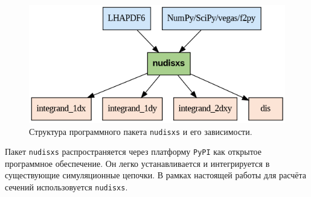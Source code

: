 \begin{figure}[!h]
\centering
\includegraphics[width=\linewidth]{images/nudisxs_diagram.png}
\caption{Структура программного пакета \texttt{nudisxs} и его зависимости.}
\label{fig:nudisxs1}
\end{figure}

Пакет \texttt{nudisxs} распространяется через платформу \texttt{PyPI} как открытое программное обеспечение. 
Он легко устанавливается и интегрируется в существующие симуляционные цепочки. 
В рамках настоящей работы для расчёта сечений использовуется \texttt{nudisxs}.

